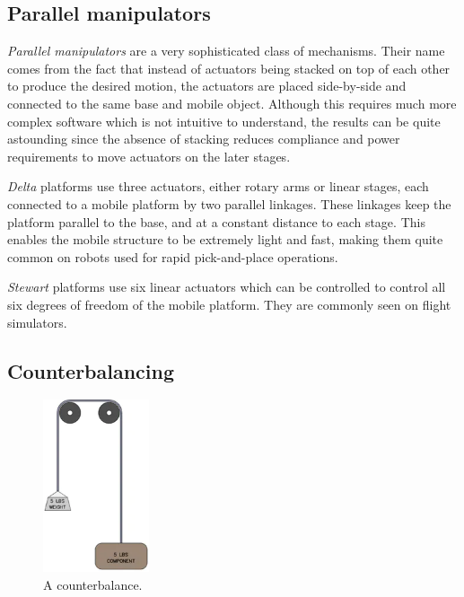 \subsection{Parallel manipulators}
\textit{Parallel manipulators} are a very sophisticated class of mechanisms. Their name comes from the fact that instead of actuators being stacked on top of each other to produce the desired motion, the actuators are placed side-by-side and connected to the same base and mobile object. Although this requires much more complex software which is not intuitive to understand, the results can be quite astounding since the absence of stacking reduces compliance and power requirements to move actuators on the later stages.

\begin{asparaenum}[a)]
	\item \textit{Delta} platforms use three actuators, either rotary arms or linear stages, each connected to a mobile platform by two parallel linkages. These linkages keep the platform parallel to the base, and at a constant distance to each stage. This enables the mobile structure to be extremely light and fast, making them quite common on robots used for rapid pick-and-place operations.
	\item \textit{Stewart} platforms use six linear actuators which can be controlled to control all six degrees of freedom of the mobile platform. They are commonly seen on flight simulators. %
\end{asparaenum}

\subsection{Counterbalancing}
\begin{figure}[H]
	\includegraphics[height=2in]{imgs/counterbalance.png}
	\caption{A counterbalance.}
\end{figure}

